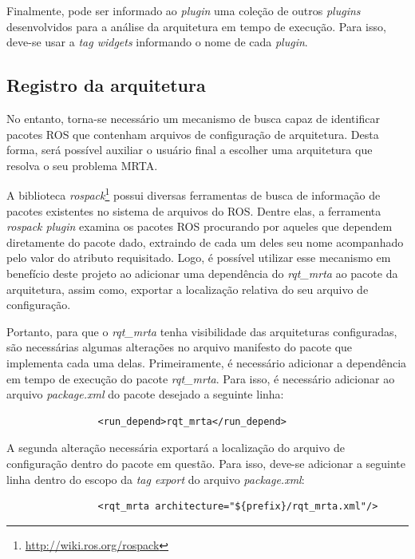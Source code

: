             Finalmente, pode ser informado ao \textit{plugin} uma coleção de outros \textit{plugins} desenvolvidos para a análise da arquitetura em tempo de execução. Para isso, deve-se usar a \textit{tag widgets} informando o nome de cada \textit{plugin}.
        
        \subsection{Registro da arquitetura} \label{subsec:arch_config_rgst}
            No entanto, torna-se necessário um mecanismo de busca capaz de identificar pacotes ROS que contenham arquivos de configuração de arquitetura. Desta forma, será possível auxiliar o usuário final a escolher uma arquitetura que resolva o seu problema MRTA.
            
            A biblioteca \textit{rospack}\footnote{\url{http://wiki.ros.org/rospack}} possui diversas ferramentas de busca de informação de pacotes existentes no sistema de arquivos do ROS. Dentre elas, a ferramenta \textit{rospack plugin} examina os pacotes ROS procurando por aqueles que dependem diretamente do pacote dado, extraindo de cada um deles seu nome acompanhado pelo valor do atributo requisitado. Logo, é possível utilizar esse mecanismo em benefício deste projeto ao adicionar uma dependência do \textit{rqt\_mrta} ao pacote da arquitetura, assim como, exportar a localização relativa do seu arquivo de configuração. 
            
            Portanto, para que o \textit{rqt\_mrta} tenha visibilidade das arquiteturas configuradas, são necessárias algumas alterações no arquivo manifesto do pacote que implementa cada uma delas. Primeiramente, é necessário adicionar a dependência em tempo de execução do pacote \textit{rqt\_mrta}. Para isso, é necessário adicionar ao arquivo \textit{package.xml} do pacote desejado a seguinte linha:
            
            \begin{lstlisting}
                <run_depend>rqt_mrta</run_depend>
            \end{lstlisting}
            
            A segunda alteração necessária exportará a localização do arquivo de configuração dentro do pacote em questão. Para isso, deve-se adicionar a seguinte linha dentro do escopo da \textit{tag export} do arquivo \textit{package.xml}:
            
            \begin{lstlisting}
                <rqt_mrta architecture="${prefix}/rqt_mrta.xml"/>
            \end{lstlisting}
            
